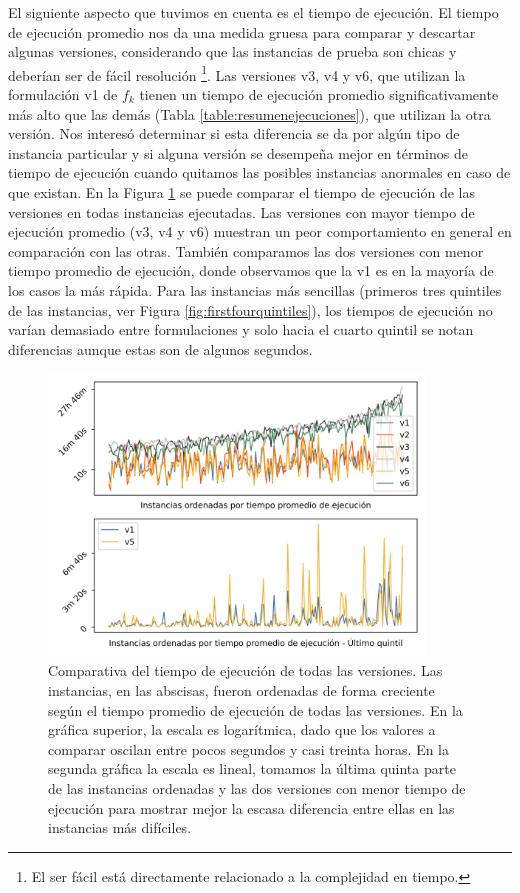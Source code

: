 El siguiente aspecto que tuvimos en cuenta es el tiempo de ejecución. El tiempo de ejecución promedio nos da una medida gruesa para comparar y descartar algunas versiones, considerando que las instancias de prueba son chicas y deberían ser de fácil resolución \footnote{El ser fácil está directamente relacionado a la complejidad en tiempo.}. Las versiones v3, v4 y v6, que utilizan la formulación v1 de $f_k$ tienen un tiempo de ejecución promedio significativamente más alto que las demás (Tabla \ref{table:resumenejecuciones}), que utilizan la otra versión. Nos interesó determinar si esta diferencia se da por algún tipo de instancia particular y si alguna versión se desempeña mejor en términos de tiempo de ejecución cuando quitamos las posibles instancias anormales en caso de que existan. En la Figura \ref{fig:runtimecomparison} se puede comparar el tiempo de ejecución de las versiones en todas instancias ejecutadas. Las versiones con mayor tiempo de ejecución promedio (v3, v4 y v6) muestran un peor comportamiento en general en comparación con las otras. También comparamos las dos versiones con menor tiempo promedio de ejecución, donde observamos que la v1 es en la mayoría de los casos la más rápida. Para las instancias más sencillas (primeros tres quintiles de las instancias, ver Figura \ref{fig:firstfourquintiles}), los tiempos de ejecución no varían demasiado entre formulaciones y solo hacia el cuarto quintil se notan diferencias aunque estas son de algunos segundos.

\begin{figure}[h!]
  \centering
  \includegraphics[width=10cm]{../resources/run_time_comparsion.png}
  \caption{Comparativa del tiempo de ejecución de todas las versiones. Las instancias, en las abscisas, fueron ordenadas de forma creciente según el tiempo promedio de ejecución de todas las versiones. En la gráfica superior, la escala es logarítmica, dado que los valores a comparar oscilan entre pocos segundos y casi treinta horas. En la segunda gráfica la escala es lineal, tomamos la última quinta parte de las instancias ordenadas y las dos versiones con menor tiempo de ejecución para mostrar mejor la escasa diferencia entre ellas en las instancias más difíciles.}
  \label{fig:runtimecomparison}
\end{figure}

